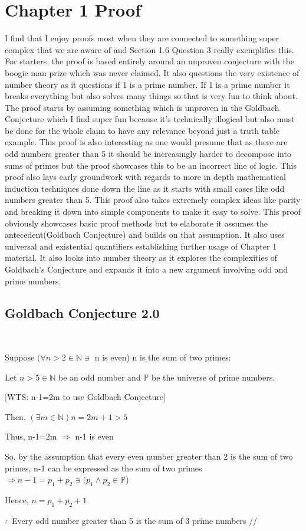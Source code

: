 \documentclass{article}
\begin{document}
\section{Chapter 1 Proof}
\justifying
I find that I enjoy proofs most when they are connected to something super complex that we are aware of and Section 1.6 Question 3 really exemplifies this. For starters, the proof is based entirely around an unproven conjecture with the boogie man prize which was never claimed. It also questions the very existence of number theory as it questions if 1 is a prime number. If 1 is a prime number it breaks everything but also solves many things so that is very fun to think about. The proof starts by assuming something which is unproven in the Goldbach Conjecture which I find super fun because it's technically illogical but also must be done for the whole claim to have any relevance beyond just a truth table example. This proof is also interesting as one would presume that as there are odd numbers greater than 5 it should be increasingly harder to decompose into sums of primes but the proof showcases this to be an incorrect line of logic. This proof also lays early groundwork with regards to more in depth mathematical induction techniques done down the line as it starts with small cases like odd numbers greater than 5. This proof also takes extremely complex ideas like parity and breaking it down into simple components to make it easy to solve. This proof obviously showcases basic proof methods but to elaborate it assumes the antecedent(Goldbach Conjecture) and builds on that assumption. It also uses universal and existential quantifiers establishing further usage of Chapter 1 material. It also looks into number theory as it explores the complexities of Goldbach's Conjecture and expands it into a new argument involving odd and prime numbers.


\newpage

\subsection{Goldbach Conjecture 2.0}
\
\begin{center}
\raggedright
Suppose $(\forall n>2 \in \mathbb{N} \ni$ n is even) n is the sum of two primes:

Let $n>5 \in \mathbb{N}$ be an odd number and $\mathbb{P}$ be the universe of prime numbers.

[WTS: n-1=2m to use Goldbach Conjecture]

Then, $(\exists m \in \mathbb{ N}) n=2m+1>5$

Thus, n-1=2m $\Rightarrow$ n-1 is even

So, by the assumption that every even number greater than 2 is the sum of two primes, n-1 can be expressed as the sum of two primes $\Rightarrow n-1=p_1+p_2 \ni (p_1 \wedge p_2 \in \mathbb{P}$)

Hence, $n=p_1+p_2+1$

$\therefore$ Every odd number greater than 5 is the sum of 3 prime numbers  //
\end{center}
\newpage
\end{document}

